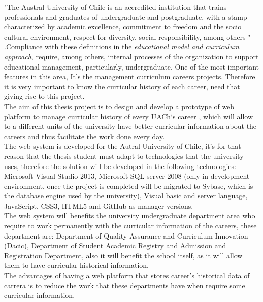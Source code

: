 

"The Austral University of Chile is an accredited institution that trains professionals and graduates of undergraduate and postgraduate, with a stamp characterized by academic excellence, commitment to freedom and the socio cultural environment, respect for diversity, social responsibility, among others "\hspace{0.2cm} \cite{MOD07}.Compliance with these definitions in the \textit{educational model and curriculum approach}, require, among others, internal processes of the organization to support educational management, particularly, undergraduate. One of the most important features in this area, It’s the management curriculum careers projects. Therefore it is very important to know the curricular history of each career, need that giving rise to this project.
\\

The aim of this thesis project is to design and develop a prototype of web platform to manage curricular history of every UACh‘s career , which will allow to a different units of the university have better curricular information about the careers and thus facilitate the work done every day.
\\

The web system is developed for the Autral University of Chile, it’s for that reason that the thesis student must adapt to technologies that the university uses, therefore the solution will be developed in the following technologies: Microsoft Visual Studio 2013, Microsoft SQL server 2008 (only in development environment, once the project is completed will be migrated to Sybase, which is the database engine used by the university), Visual basic and server language, JavaScript, CSS3, HTML5 and GitHub as manager versions.
\\

The web system will benefits the university undergraduate department area who require to work permanently with the curricular information of the careers, these department are: Department of Quality Assurance and Curriculum Innovation (Dacic), Department of Student Academic Registry and Admission and Registration Department, also it will benefit the school itself, as it will allow them to have curricular historical information.
\\

The advantages of having a web platform that stores career’s historical data of carrera is to reduce the work that these departments have when require some curricular information.